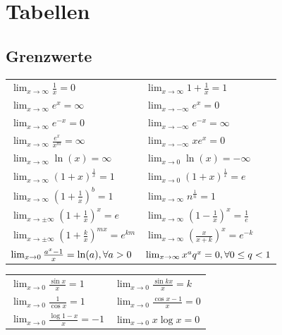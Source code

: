 \documentclass[a4paper,10pt]{article}
\def\limxo{\lim_{x\to 0}}
\def\limxi{\lim_{x\to\infty}}
\def\limxn{\lim_{x\to-\infty}}
\begin{document}
				\section{Tabellen}
				\subsection{Grenzwerte}
				\begin{center}
					\begin{tabularx}{\linewidth}{XX}
						\toprule
						$\limxi \frac{1}{x} = 0$                                   & $\limxi 1 + \frac{1}{x} = 1$             \\
						$\limxi e^x = \infty$                                      & $\limxn e^x = 0$                         \\
						$\limxi e^{-x} = 0$                                        & $\limxn e^{-x} = \infty$                 \\
						$\limxi \frac{e^x}{x^m} = \infty$                          & $\limxn xe^x = 0$                        \\
						$\limxi \ln(x) = \infty$                                   & $\limxo \ln(x) = -\infty$                \\
						$\limxi (1+x)^{\frac{1}{x}} = 1$                           & $\limxo (1+x)^{\frac{1}{x}} = e$         \\
						$\limxi (1+\frac{1}{x})^b = 1$                             & $\limxi n^{\frac{1}{n}} = 1$             \\
						$\lim_{x\to\pm\infty} (1 + \frac{1}{x})^x = e$             & $\limxi (1-\frac{1}{x})^x = \frac{1}{e}$ \\
						$\lim_{x\to\pm\infty} (1 + \frac{k}{x})^{mx} = e^{km}$     & $\limxi (\frac{x}{x+k})^x = e^{-k}$      \\
						$\limxo \frac{a^x -1}{x} = \ln(a), \newline \forall a > 0$ &                                          
						$\limxi x^a q^x = 0, \newline \forall 0 \le q < 1$ \\
					\end{tabularx}
					\begin{tabularx}{\linewidth}{XX}
						$\limxo \frac{\sin x}{x} = 1$                 & $\limxo \frac{\sin kx}{x} = k$     \\
						$\limxo \frac{1}{\cos x} = 1$                 & $\limxo \frac{\cos x -1}{x} = 0$   \\
						$\limxo \frac{\log 1 - x}{x} = -1$            & $\limxo x \log x = 0$              \\

\end{tabularx}
\end{center}
\end{document}

